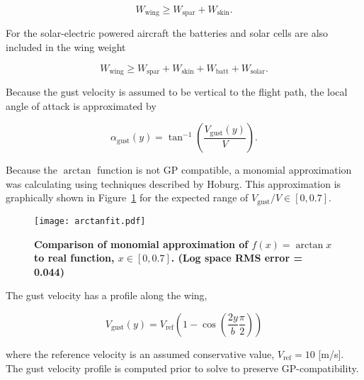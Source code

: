 \documentclass[]{aiaa-tc}%
\begin{document}
\begin{equation}
    W_{\text{wing}} \geq W_{\text{spar}} + W_{\text{skin}}.
\end{equation}

For the solar-electric powered aircraft the batteries and solar cells are also included in the wing weight

\begin{equation}
    W_{\text{wing}} \geq W_{\text{spar}} + W_{\text{skin}} + W_{\text{batt}} + W_{\text{solar}}.
\end{equation}

Because the gust velocity is assumed to be vertical to the flight path, the local angle of attack is approximated by 

\begin{equation}
    \label{e:gustalpha}
    \alpha_{\text{gust}}(y)  = \tan^{-1}\left(\frac{V_{\text{gust}}(y)}{V} \right).
\end{equation}

Because the $\arctan$ function is not GP compatible, a monomial approximation was calculating using techniques described by Hoburg\cite{fitting}.
This approximation is graphically shown in Figure~\ref{f:arctanfit} for the expected range of $V_{\text{gust}}/V \in [0, 0.7]$.  

\begin{figure}[H]
	\begin{center}
	\texttt{[image: arctanfit.pdf]}
    \caption{\textbf{Comparison of monomial approximation of $f(x) = \arctan{x}$ to real function, $x \in [0,0.7]$. (Log space RMS error = 0.044)}}
	\label{f:arctanfit}
	\end{center}
\end{figure}

The gust velocity has a profile along the wing\cite{acgust},

\begin{equation}
    \label{e:gustwind}
    V_{\text{gust}}(y) = V_{\text{ref}} \left(1-\cos\left(\frac{2y}{b} \frac{\pi}{2} \right) \right)
\end{equation}

where the reference velocity is an assumed conservative value\cite{acgust}, $V_{\text{ref}} = 10$ [m/s]. The gust velocity profile is computed prior to solve to preserve GP-compatibility.

\end{document}
